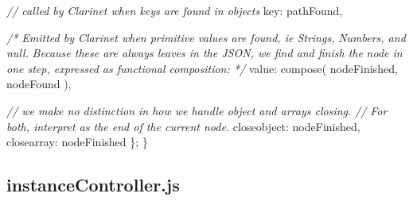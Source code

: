 \documentclass[]{article}
\newenvironment{Shaded}{}{}
\newcommand{\DataTypeTok}[1]{\textcolor[rgb]{0.56,0.13,0.00}{{#1}}}
\newcommand{\CommentTok}[1]{\textcolor[rgb]{0.38,0.63,0.69}{\textit{{#1}}}}
\newcommand{\FunctionTok}[1]{\textcolor[rgb]{0.02,0.16,0.49}{{#1}}}
\newcommand{\NormalTok}[1]{{#1}}
\begin{document}
\begin{Shaded}
\begin{Highlighting}[]
      \CommentTok{// called by Clarinet when keys are found in objects               }
      \DataTypeTok{key}\NormalTok{: pathFound,}
      
      \CommentTok{/* Emitted by Clarinet when primitive values are found, ie Strings,}
\CommentTok{         Numbers, and null.}
\CommentTok{         Because these are always leaves in the JSON, we find and finish the }
\CommentTok{         node in one step, expressed as functional composition: */}
      \DataTypeTok{value}\NormalTok{: }\FunctionTok{compose}\NormalTok{( nodeFinished, nodeFound ),}
      
      \CommentTok{// we make no distinction in how we handle object and arrays closing.}
      \CommentTok{// For both, interpret as the end of the current node.}
      \DataTypeTok{closeobject}\NormalTok{: nodeFinished,}
      \DataTypeTok{closearray}\NormalTok{: nodeFinished}
   \NormalTok{\};}
\NormalTok{\}}
\end{Highlighting}
\end{Shaded}

\pagebreak

\subsection{instanceController.js}

\label{src_instanceController}
\end{document}
